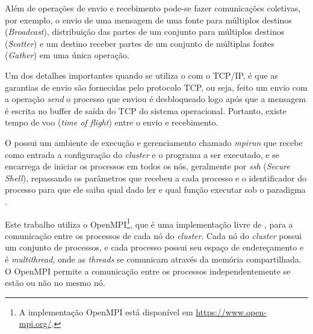 
Além de operações de envio e recebimento pode-se fazer comunicações coletivas,
por exemplo, o envio de uma mensagem de uma fonte para múltiplos destinos
(\emph{Broadcast}), distribuição das partes de um conjunto para múltiplos
destinos (\emph{Scatter}) e um destino receber partes de um conjunto de
múltiplas fontes (\emph{Gather}) em uma única operação.

Um dos detalhes importantes quando se utiliza o \mpi com o TCP/IP, é que as
garantias de envio são fornecidas pelo protocolo TCP, ou seja, feito um envio
com a operação \emph{send} o processo que enviou é desbloqueado logo após que a
mensagem é escrita no buffer de saída do TCP do sistema operacional. Portanto,
existe tempo de voo (\emph{time of flight}) entre o envio e recebimento.

O \mpi possui um ambiente de execução e gerenciamento chamado \emph{mpirun} que
recebe como entrada a configuração do \emph{cluster} e o programa a ser executado, e se
encarrega de iniciar os processos em todos os nós, geralmente por \emph{ssh} (\emph{Secure Shell}),
repassando os parâmetros que recebeu a cada processo e o identificador do
processo para que ele saiba qual dado ler e qual função executar sob o paradigma
\spmd.

Este trabalho utiliza o OpenMPI\footnote{
    A implementação OpenMPI está disponível em \url{https://www.open-mpi.org/}.
}, que é uma implementação livre de \mpi, para a
comunicação entre os processos de cada nó do \emph{cluster}.
Cada nó do \emph{cluster} possui um conjunto de processos, e cada processo possui seu
espaço de endereçamento e é \emph{multithread}, onde as \emph{threads} se comunicam
através da memória compartilhada.
O OpenMPI permite a comunicação entre os processos independentemente se estão ou não
no mesmo nó.



